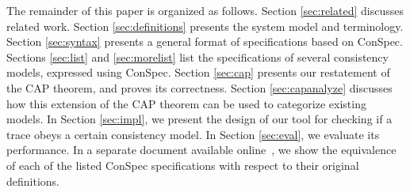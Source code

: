 \documentclass[conference]{IEEEtran}
\begin{document}
	
	The remainder of this paper is organized as follows. Section \ref{sec:related} discusses related work. Section  \ref{sec:definitions} presents the system model and terminology.  Section \ref{sec:syntax} presents a general format of specifications based on ConSpec. Sections \ref{sec:list} and \ref{sec:morelist} list the specifications of several consistency models, expressed using ConSpec. %
	Section \ref{sec:cap} presents our restatement of the CAP theorem, %
	and proves its correctness.  Section \ref{sec:capanalyze} discusses how this extension of the CAP theorem can be used to categorize existing models. %
	In Section \ref{sec:impl}, we present the design of our tool for checking if a trace obeys a certain consistency model. In Section  \ref{sec:eval}, we evaluate its performance. 
	In a separate document available online~\cite{ConspecExtended2018}, we show the equivalence of each of the listed ConSpec specifications with respect to their original definitions.
	
	
	
\end{document}
